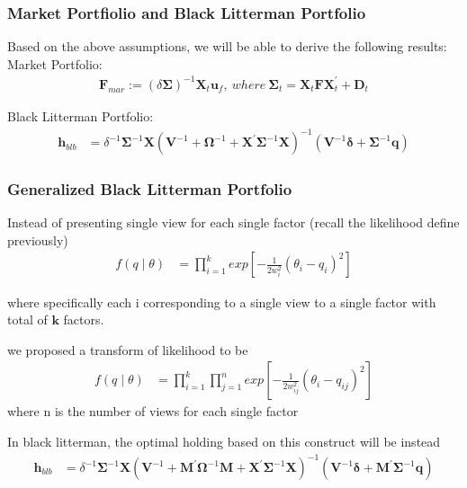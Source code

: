\documentclass[12pt]{article}
\numberwithin{equation}{section}
\begin{document}
\subsubsection{Market Portfiolio and Black Litterman Portfolio}
Based on the above assumptions, we will be able to derive the following results:
Market Portfolio:
\begin{align}
\textbf{F}_{mar} := (\delta \boldsymbol{\Sigma})^{-1}  \textbf{X}_t \textbf{u}_f, \ where \ \boldsymbol{\Sigma}_{t} = \textbf{X}_t \textbf{F}  \textbf{X}_t^{'} + \textbf{D}_t
\end{align}

Black Litterman Portfolio:
\begin{align}
\textbf{h}_{blb} &= \delta^{-1} \boldsymbol{\Sigma}^{-1} \textbf{X}(\textbf{V}^{-1}+ \boldsymbol{\Omega}^{-1}+\textbf{X}^{'}\boldsymbol{\Sigma}^{-1}\textbf{X})^{-1}(\textbf{V}^{-1}\boldsymbol{\delta} + \boldsymbol{\Sigma}^{-1}\textbf{q})
\end{align}
 
 
\subsubsection{Generalized Black Litterman Portfolio}
Instead of presenting single view for each single factor (recall the likelihood define previously)
\begin{align} 
f(q \mid \theta) &= \prod_{i=1}^{k} exp[{-\frac{1}{2w_i^2}(\theta_i - q_i)^2}]
\end{align}

where specifically each i corresponding to a single view to a single factor with total of $\textbf{k}$ factors.

we proposed a transform of likelihood to be
\begin{align} 
f(q \mid \theta) &= \prod_{i=1}^{k}\prod_{j=1}^{n} exp[{-\frac{1}{2w_{ij}^2}(\theta_i - q_{ij})^2}]
\end{align}
where n is the number of views for each single factor

In black litterman, the optimal holding based on this construct will be instead 
\begin{align}
\textbf{h}_{blb} &= \delta^{-1} \boldsymbol{\Sigma}^{-1} \textbf{X}(\textbf{V}^{-1}+ \textbf{M}^{'}\boldsymbol{\Omega}^{-1}\textbf{M}+\textbf{X}^{'}\boldsymbol{\Sigma}^{-1}\textbf{X})^{-1}(\textbf{V}^{-1}\boldsymbol{\delta} +  \textbf{M}^{'}\boldsymbol{\Sigma}^{-1}\textbf{q})
\end{align}
\end{document}
